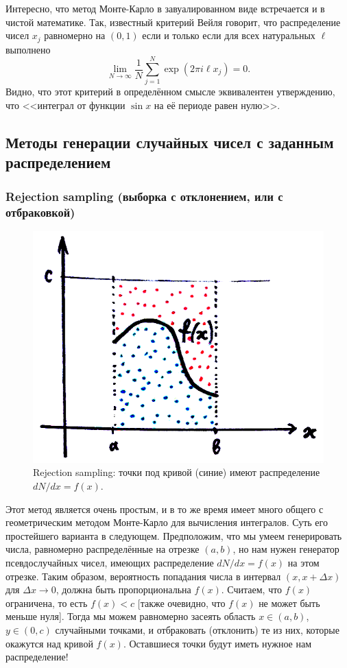 \documentclass{book}
\begin{document}
Интересно, что метод Монте-Карло в завуалированном виде встречается и в чистой математике. Так,
известный критерий Вейля говорит, что распределение чисел $x_j$ равномерно на $(0, 1)$ если и
только если для всех натуральных $\ell$ выполнено
\begin{equation}
    \lim_{N \to \infty} \frac{1}{N} \sum_{j = 1}^N \exp(2 \pi i \ell x_j) = 0.
\end{equation}
Видно, что этот критерий в определённом смысле эквивалентен утверждению, что <<интеграл от функции
$\sin x$ на её периоде равен нулю>>.

\clearpage

\subsection{Методы генерации случайных чисел с заданным распределением}

\subsubsection{Rejection sampling (выборка с отклонением, или с отбраковкой)}

\begin{figure}
	\includegraphics[width=0.6\linewidth]{rejection-sampling.png}
    \caption{\label{dots-for-monte-carlo}Rejection sampling: точки под кривой (синие) имеют
    распределение $dN/dx = f(x)$.}
\end{figure}

Этот метод является очень простым, и в то же время имеет много общего с геометрическим методом
Монте-Карло для вычисления интегралов. Суть его простейшего варианта в следующем. Предположим, что
мы умеем генерировать числа, равномерно распределённые на отрезке $(a, b)$, но нам нужен генератор
псевдослучайных чисел, имеющих распределение $dN/dx = f(x)$ на этом отрезке. Таким образом,
вероятность попадания числа в интервал $(x, x + \Delta x)$ для $\Delta x \to 0$, должна быть
пропорциональна $f(x)$.  Считаем, что $f(x)$ ограничена, то есть $f(x) < c$ [также очевидно, что
$f(x)$ не может быть меньше нуля]. Тогда мы можем равномерно засеять область $x \in (a, b)$, $y \in
(0, c)$ случайными точками, и отбраковать (отклонить) те из них, которые окажутся над кривой $f(x)$.
Оставшиеся точки будут иметь нужное нам распределение!
\end{document}

